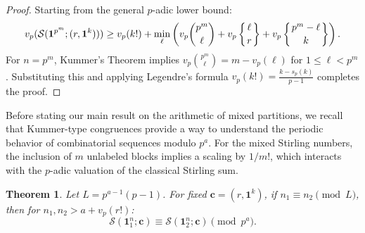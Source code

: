\documentclass[12pt]{amsart}
\newtheorem{theorem}{Theorem}[section]
\theoremstyle{definition}
\newcommand{\vn}{\mathbf{1}^n}
\begin{document}
\begin{proof}
Starting from the general $p$-adic lower bound:
\begin{equation*}
    v_p(\mathcal{S}(\mathbf{1}^{p^m}; (r, \mathbf{1}^k))) \geq v_p(k!) + \min_{\ell} \left( v_p \binom{p^m}{\ell} + v_p \left\{ \genfrac{}{}{0pt}{}{\ell}{r} \right\} + v_p \left\{ \genfrac{}{}{0pt}{}{p^m-\ell}{k} \right\} \right).
\end{equation*}
For $n=p^m$, Kummer's Theorem implies $v_p \binom{p^m}{\ell} = m - v_p(\ell)$ for $1 \le \ell < p^m$. Substituting this and applying Legendre's formula $v_p(k!) = \frac{k - s_p(k)}{p-1}$ completes the proof. 
\end{proof}
Before stating our main result on the arithmetic of mixed partitions, we recall that Kummer-type congruences provide a way to understand the periodic behavior of combinatorial sequences modulo $p^a$. For the mixed Stirling numbers, the inclusion of $m$ unlabeled blocks implies a scaling by $1/m!$, which interacts with the $p$-adic valuation of the classical Stirling sum.
\begin{theorem}%
Let $L = p^{a-1}(p-1)$. For fixed $\mathbf{c} = (r, \mathbf{1}^k)$, if $n_1 \equiv n_2 \pmod{L}$, then for $n_1, n_2 > a + v_p(r!)$:
\begin{equation}
    \mathcal{S}(\vn_1; \mathbf{c}) \equiv \mathcal{S}(\vn_2; \mathbf{c}) \pmod{p^a}.
\end{equation}
\end{theorem}
\end{document}
